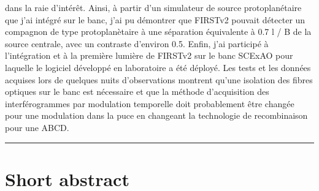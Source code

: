 dans la raie d’intérêt. Ainsi, à partir d’un simulateur de source protoplanétaire que j’ai intégré sur le banc, j’ai pu démontrer que FIRSTv2 pouvait détecter un compagnon de type protoplanètaire à une séparation équivalente à 0.7 l / B de la source centrale, avec un contraste d’environ 0.5. Enfin, j’ai participé à l’intégration et à la première lumière de FIRSTv2 sur le banc SCExAO pour laquelle le logiciel développé en laboratoire a été déployé. Les tests et les données acquises lors de quelques nuits d’observations montrent qu’une isolation des fibres optiques sur le banc est nécessaire et que la méthode d’acquisition des interférogrammes par modulation temporelle doit probablement être changée pour une modulation dans la puce en changeant la technologie de recombinaison pour une ABCD.

\vspace{0.2cm}
 \keywordnamesfr

\noindent\rule[2pt]{\textwidth}{0.5pt}




\chapter*{Short abstract}

